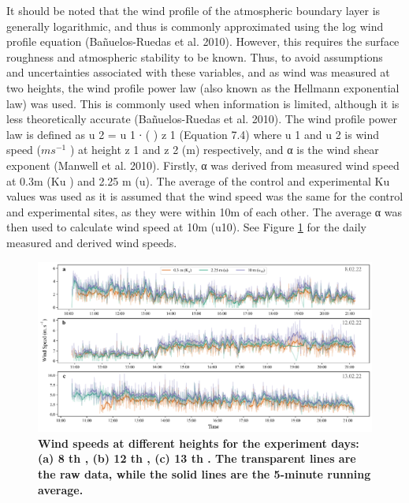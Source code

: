 \documentclass[final,3p,times,authoryear]{elsarticle}
\begin{document}
It should be noted that the wind profile of the atmospheric boundary layer is generally
logarithmic, and thus is commonly approximated using the log wind profile equation
(Bañuelos-Ruedas et al. 2010). However, this requires the surface roughness and
atmospheric stability to be known. Thus, to avoid assumptions and uncertainties
associated with these variables, and as wind was measured at two heights, the wind
profile power law (also known as the Hellmann exponential law) was used. This is
commonly used when information is limited, although it is less theoretically accurate
(Bañuelos-Ruedas et al. 2010).
The wind profile power law is defined as
u 2 = \gls{u} 1 ∙ ( )
z 1
(Equation 7.4)
where u 1 and u 2 is wind speed ($ms^{-1}$ ) at height z 1 and z 2 (m) respectively, and α is the
wind shear exponent (Manwell et al. 2010). Firstly, α was derived from measured wind
speed at 0.3m (\gls{Ku}  ) and 2.25 m (u). The average of the control and experimental \gls{Ku} 
values was used as it is assumed that the wind speed was the same for the control and
experimental sites, as they were within 10m of each other. The average α was then used
to calculate wind speed at 10m (\gls{u10}). See Figure \ref{fig:7.7} for the daily measured and derived
wind speeds.

\begin{figure}
\centering
\includegraphics[trim={0 0 0 0},clip,scale=1.0]{pict024.png}
\caption{\bf Wind speeds at different heights for the experiment days: (a) 8 th , (b) 12 th , (c) 13 th . The
transparent lines are the raw data, while the solid lines are the 5-minute running average.}
 \label{fig:7.7}
\end{figure}

\end{document}
